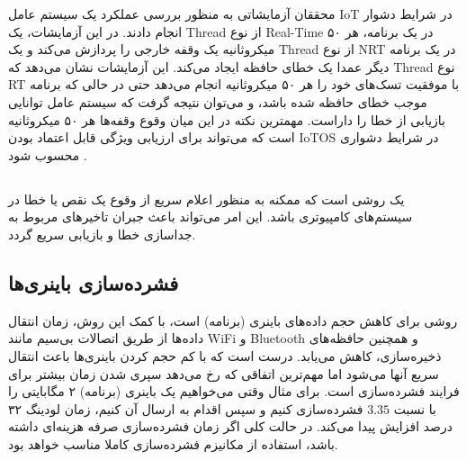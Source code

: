 \documentclass[10pt, a4paper]{article}
\begin{document}
\begin{table}[h]
    \centering
    \begin{RTL}
      \caption{
      تسک‌ها}
    \end{RTL}
\end{table}

محققان آزمایشاتی به منظور بررسی عملکرد یک سیستم عامل IoT در شرایط دشوار انجام
دادند. در این آزمایشات، یک Thread از نوع Real-Time در یک برنامه، هر ۵۰
میکروثانیه یک وقفه خارجی را پردازش می‌کند و یک Thread از نوع NRT در یک برنامه
دیگر عمدا یک خطای حافظه ایجاد می‌کند. این آزمایشات نشان می‌دهد که Thread نوع RT
با موفقیت تسک‌های خود را هر ۵۰ میکروثانیه انجام می‌دهد حتی در حالی که برنامه
موجب خطای حافظه شده باشد، و می‌توان نتیجه گرفت که سیستم عامل توانایی بازیابی از
خطا را داراست. مهمترین نکته در این میان وقوع وقفه‌ها هر ۵۰ میکروثانیه است که
می‌تواند برای ارزیابی ویژگی قابل اعتماد بودن IoTOS در شرایط دشواری محسوب شود
\cite{samsung21tizen}.

\subsection{}

یک روشی است که ممکنه به منظور اعلام سریع از وقوع یک نقص یا خطا در سیستم‌های
کامپیوتری باشد. این امر می‌تواند باعث جبران تاخیر‌های مربوط به جداسازی خطا و
بازیابی سریع گردد.

\subsection{فشرده‌سازی باینری‌ها}

روشی برای کاهش حجم داده‌های باینری (برنامه) است، با کمک این روش، زمان انتقال
داده‌ها از طریق اتصالات بی‌سیم مانند WiFi و Bluetooth و همچنین حافظه‌های
ذخیره‌سازی، کاهش می‌یابد. درست است که با کم حجم کردن باینری‌ها باعث انتقال سریع
آنها می‌شود اما مهم‌ترین اتفاقی که رخ می‌دهد سپری شدن زمان بیشتر برای فرایند
فشرده‌سازی است.  برای مثال وقتی می‌خواهیم یک باینری (برنامه) ۲ مگابایتی را با
نسبت $3.35$ فشرده‌سازی کنیم و سپس اقدام به ارسال آن کنیم، زمان لودینگ ۳۲ درصد
افزایش پیدا می‌کند. در حالت کلی اگر زمان فشرده‌سازی صرفه هزینه‌ای داشته باشد،
استفاده از مکانیزم فشرده‌سازی کاملا مناسب خواهد بود.
\end{document}

